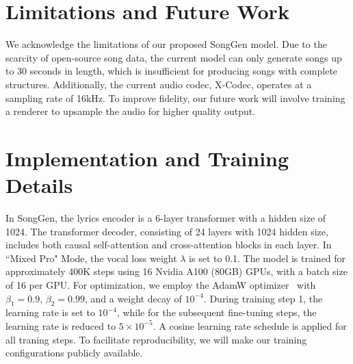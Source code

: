 


\section{Limitations and Future Work}
We acknowledge the limitations of our proposed SongGen model. Due to the scarcity of open-source song data, the current model can only generate songs up to 30 seconds in length, which is insufficient for producing songs with complete structures. Additionally, the current audio codec, X-Codec, operates at a sampling rate of 16kHz. To improve fidelity, our future work will involve training a renderer to upsample the audio for higher quality output.

\section{Implementation and Training Details}
In SongGen, the lyrics encoder is a 6-layer transformer with a hidden size of 1024. The transformer decoder, consisting of 24 layers with 1024 hidden size, includes both causal self-attention and cross-attention blocks in each layer. In ``Mixed Pro" Mode, the vocal loss weight $\lambda$ is set to 0.1. The model is trained for approximately 400K steps using 16 Nvidia A100 (80GB) GPUs, with a batch size of 16 per GPU. For optimization, we employ the AdamW optimizer~\cite{loshchilov2018decoupled} with $\beta_1 = 0.9$, $\beta_2 = 0.99$, and a weight decay of $10^{-4}$. During training step 1, the learning rate is set to $10^{-4}$, while for the subsequent fine-tuning steps, the learning rate is reduced to $5 \times10^{-5}$. A cosine learning rate schedule is applied for all traning steps. To facilitate reproducibility, we will make our training configurations publicly available.





